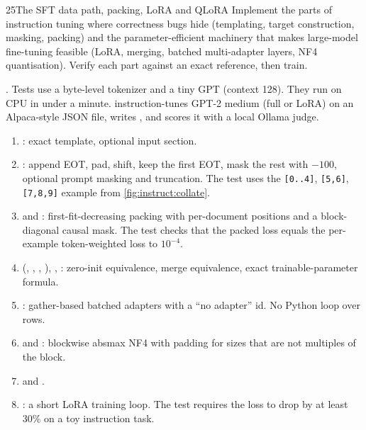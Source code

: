 \begin{labbox}{25}{The SFT data path, packing, LoRA and QLoRA}
Implement the parts of instruction tuning where correctness bugs hide (templating,
target construction, masking, packing) and the parameter-efficient machinery that
makes large-model fine-tuning feasible (LoRA, merging, batched multi-adapter layers,
NF4 quantisation). Verify each part against an exact reference, then train.

.
Tests use a byte-level tokenizer and a tiny GPT (context 128). They run on CPU in under
a minute.  instruction-tunes GPT-2 medium (full or LoRA) on an Alpaca-style
JSON file, writes , and scores it with a local Ollama judge.

\begin{enumerate}
\item {}: exact template, optional input section.
\item {}: append EOT, pad, shift, keep the first EOT, mask the
rest with $-100$, optional prompt masking and truncation. The test uses the
\texttt{[0..4]}, \texttt{[5,6]}, \texttt{[7,8,9]} example from
\cref{fig:instruct:collate}.
\item {} and : first-fit-decreasing packing with
per-document positions and a block-diagonal causal mask. The test checks that the
packed loss equals the per-example token-weighted loss to $10^{-4}$.
\item {} (, , ,
), , : zero-init equivalence,
merge equivalence, exact trainable-parameter formula.
\item {}: gather-based batched adapters with a ``no adapter''
id. No Python loop over rows.
\item {} and : blockwise absmax NF4 with padding
for sizes that are not multiples of the block.
\item {} and .
\item {}: a short LoRA training loop. The test requires the loss to drop by
at least 30\% on a toy instruction task.
\end{enumerate}


\end{labbox}
